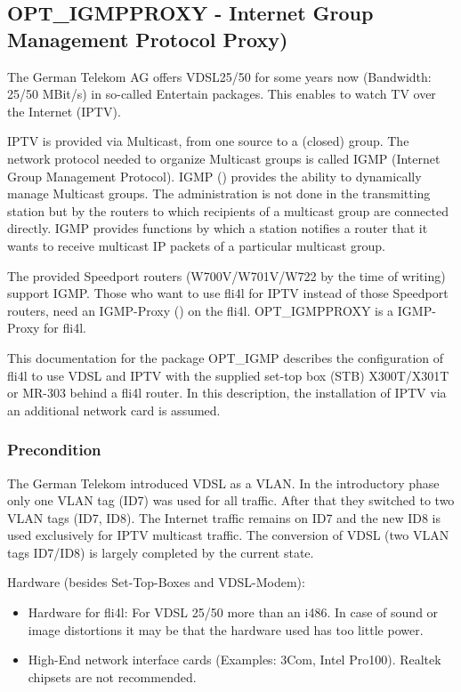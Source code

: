 \subsection{OPT\_IGMPPROXY - Internet Group Management Protocol Proxy)}

The German Telekom AG offers VDSL25/50 for some years now (Bandwidth: 25/50 MBit/s)
in so-called Entertain packages. This enables to watch TV over the Internet (IPTV).

IPTV is provided via Multicast, from one source to a (closed) group. The network protocol
needed to organize Multicast groups is called IGMP (Internet Group Management Protocol).
IGMP () provides the ability to dynamically
manage Multicast groups. The administration is not done in the transmitting station but
by the routers to which recipients of a multicast group are connected directly. IGMP
provides functions by which a station notifies a router that it wants to receive
multicast IP packets of a particular multicast group.

The provided Speedport routers (W700V/W701V/W722 by the time of writing) support IGMP.
Those who want to use fli4l for IPTV instead of those Speedport routers, need an IGMP-Proxy
() on the fli4l.
OPT\_IGMPPROXY is a IGMP-Proxy for fli4l.

This documentation for the package OPT\_IGMP describes the configuration of fli4l
to use VDSL and IPTV with the supplied set-top box (STB) X300T/X301T or MR-303 behind
a fli4l router. In this description, the installation of IPTV via an additional network
card is assumed.


\subsubsection{Precondition}

The German Telekom introduced VDSL as a VLAN. In the introductory phase only one VLAN tag (ID7)
was used for all traffic. After that they switched to two VLAN tags (ID7, ID8). The Internet traffic
remains on ID7 and the new ID8 is used exclusively for IPTV multicast traffic. The conversion
of VDSL (two VLAN tags ID7/ID8) is largely completed by the current state.

Hardware (besides Set-Top-Boxes and VDSL-Modem):
\begin{itemize}
   \item{Hardware for fli4l: For VDSL 25/50 more than an i486. In case of sound or image distortions
   it may be that the hardware used has too little power.}
   \item{High-End network interface cards (Examples: 3Com, Intel Pro100). Realtek chipsets are not recommended.}
\end{itemize}


